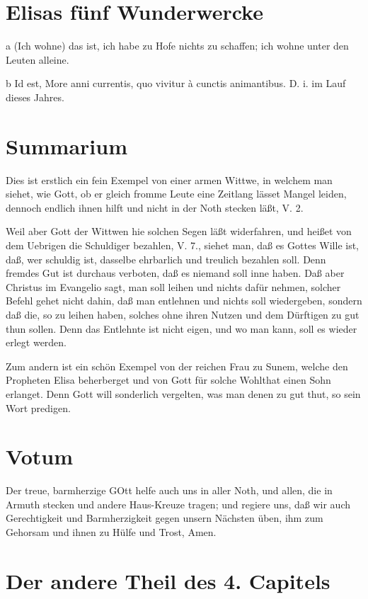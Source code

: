 \section{Elisas fünf Wunderwercke}

a (Ich wohne) das ist, ich habe zu Hofe nichts zu schaffen; ich wohne unter den Leuten alleine.

b Id est, More anni currentis, quo vivitur à cunctis animantibus. D. i. im Lauf dieses Jahres.

\section{Summarium}

Dies ist erstlich ein fein Exempel von einer armen Wittwe, in welchem man siehet, wie Gott, ob er gleich fromme Leute eine Zeitlang lässet Mangel leiden, dennoch endlich ihnen hilft und nicht in der Noth stecken läßt, V. 2.

Weil aber Gott der Wittwen hie solchen Segen läßt widerfahren, und heißet von dem Uebrigen die Schuldiger bezahlen, V. 7., siehet man, daß es Gottes Wille ist, daß, wer schuldig ist, dasselbe ehrbarlich und treulich bezahlen soll. Denn fremdes Gut ist durchaus verboten, daß es niemand soll inne haben. Daß aber Christus im Evangelio sagt, man soll leihen und nichts dafür nehmen, solcher Befehl gehet nicht dahin, daß man entlehnen und nichts soll wiedergeben, sondern daß die, so zu leihen haben, solches ohne ihren Nutzen und dem Dürftigen zu gut thun sollen. Denn das Entlehnte ist nicht eigen, und wo man kann, soll es wieder erlegt werden.

Zum andern ist ein schön Exempel von der reichen Frau zu Sunem, welche den Propheten Elisa beherberget und von Gott für solche Wohlthat einen Sohn erlanget. Denn Gott will sonderlich vergelten, was man denen zu gut thut, so sein Wort predigen.

\section{Votum}

Der treue, barmherzige GOtt helfe auch uns in aller Noth, und allen, die in Armuth stecken und andere Haus-Kreuze tragen; und regiere uns, daß wir auch Gerechtigkeit und Barmherzigkeit gegen unsern Nächsten üben, ihm zum Gehorsam und ihnen zu Hülfe und Trost, Amen.

\section{Der andere Theil des 4. Capitels}

